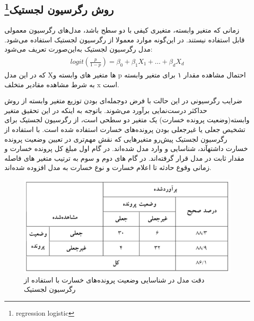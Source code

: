 \documentclass[paper=a4, fontsize=11pt]{article}
\numberwithin{equation}{section} %
\numberwithin{figure}{section} %
\numberwithin{table}{section} %
\begin{document}
\subsection{روش رگرسیون لجستیک\protect\footnote{regression logistic}}
زمانی که متغیر وابسته، متغیری کیفی با دو سطح باشد، مدل‌های رگرسیون معمولی قابل استفاده نیستند. در این‌گونه موارد معمولا از رگرسیون لجستیک استفاده می‌شود. مدل رگرسیون لجستیک به‌این‌صورت تعریف می‌شود:
\begin{align}
\begin{split}
    logit(\frac{p}{1-p}) = \beta_{0} + \beta_{1}X_{1} + ... + \beta_{d}X_{d} 
\end{split}
\end{align}
که در این مدل  X‌ها متغیر های وابسته و p احتمال مشاهده مقدار ۱ برای متغیر وابسته به شرط مشاهده مقادیر متخلف x است.
\par
ضرایب رگرسیونی در این حالت با فرض دوجمله‌ای بودن توزیع متغیر وابسته از روش حداکثر درست‌نمایی برآورد می‌شوند. باتوجه به اینکه در این تحقیق متغیر وابسته(وضعیت پرونده خسارت) یک متغیر دو سطحی است، از رگرسیون لجستیک برای تشخیص جعلی یا غیرجعلی بودن پرونده‌های خسارت استفاده شده است. با استفاده از رگرسیون لجستیک پیش‌رو متغیر‌هایی که نقش مهم‌تری در تعیین وضعیت پرونده خسارت داشتهآند، شناسایی و وارد مدل شده‌اند. در گام اول مبلغ کل پرونده خسارت و مقدار ثابت در مدل قرار گرفته‌اند. در گام های دوم و سوم به ترتیب متغیر های فاصله زمانی وقوع حادثه تا اعلام خسارت و نوع خسارت به مدل افزوده شده‌اند.
\begin{figure}[h]
    \centering
    \includegraphics[scale=1]{table-r}
    \caption{دقت مدل در شناسایی وضعیت پرونده‌های خسارت با استفاده از رگرسیون لجستیک}
    \label{fig:table-r}
\end{figure}
\end{document}
